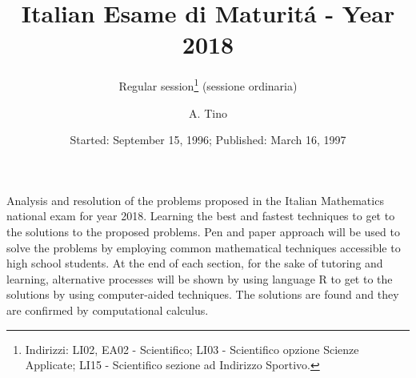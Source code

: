 \documentclass{layout}
\begin{document}
 


   \title{Italian Esame di Maturit\'a - Year 2018}

   \subtitle{Regular session\thanks{
                       Indirizzi: LI02, EA02 - Scientifico; LI03 - Scientifico opzione Scienze Applicate;
                       LI15 - Scientifico sezione ad Indirizzo Sportivo.} 
               (sessione ordinaria)}

   \author{A. Tino%
          }


   \date{Started: September 15, 1996; Published: March 16, 1997}

 
  \abstract
   {Analysis and resolution of the problems proposed in the Italian Mathematics national exam for year 2018.}
   {Learning the best and fastest techniques to get to the solutions to the proposed problems.}
   {Pen and paper approach will be used to solve the problems by employing common mathematical 
    techniques accessible to high school students. At the end of each section, for
    the sake of tutoring and learning, alternative processes will be shown by using language R to
    get to the solutions by using computer-aided techniques.}
   {The solutions are found and they are confirmed by computational calculus.}
   {}

   \maketitle
%
\end{document}
